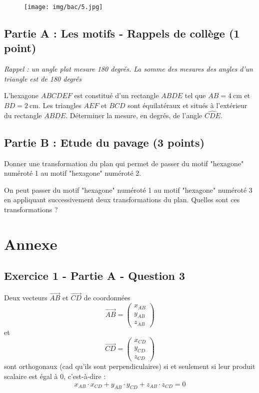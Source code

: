 \documentclass[answers]{exam}
\begin{document}
\begin{figure}[H]
  \centering
  \texttt{[image: img/bac/5.jpg]}
\end{figure}

\subsection*{Partie A : Les motifs - Rappels de collège (1 point)}

\textit{Rappel : un angle plat mesure 180 degrés. La somme des mesures des angles d'un triangle est de 180 degrés}

\begin{questions}
  \question[1] L'hexagone $ABCDEF$ est constitué d’un rectangle $ABDE$ tel que $AB=\SI{4}{\centi\metre}$ et $BD=\SI{2}{\centi\metre}$.
  Les triangles $AEF$ et $BCD$ sont équilatéraux et situés à l’extérieur du rectangle $ABDE$. Déterminer la mesure, en degrés, de l’angle $\widehat{CDE}$.
\end{questions}


\subsection*{Partie B : Etude du pavage (3 points)}

\begin{questions}
  \question[1] Donner une transformation du plan qui permet de passer du motif "hexagone" numéroté 1 au motif "hexagone" numéroté 2.
  
\question[2] On peut passer du motif "hexagone" numéroté 1 au motif "hexagone" numéroté 3 en appliquant successivement deux transformations du plan. Quelles sont ces transformations ?
\end{questions}



\section*{Annexe}

\subsection*{Exercice 1 - Partie A - Question 3}

Deux vecteurs $\overrightarrow{AB}$ et $\overrightarrow{CD}$ de coordonnées \\ 

\[
  \overrightarrow{AB} = 
  \begin{pmatrix}
    x_{AB} \\
    y_{AB} \\ 
    z_{AB}
  \end{pmatrix}
\] et
\[
  \overrightarrow{CD} = 
  \begin{pmatrix}
    x_{CD} \\
    y_{CD} \\ 
    z_{CD}
  \end{pmatrix}
\]
sont orthogonaux (cad qu'ils sont perpendiculaires) si et seulement si leur produit scalaire est égal à 0, c'est-à-dire : 
\[
  x_{AB} \cdot x_{CD} + y_{AB} \cdot y_{CD} + z_{AB} \cdot z_{CD} = 0
\]
\end{document}

